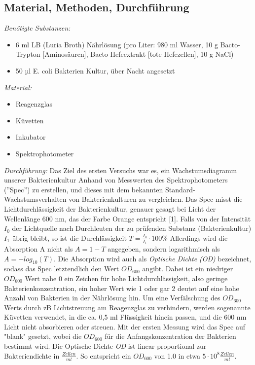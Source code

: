 \documentclass[12pt,twoside]{article}
\begin{document}
\subsection{Material, Methoden, Durchführung}
\textit{Benötigte Substanzen:}
\begin{itemize}
\item 6 ml LB (Luria Broth) Nährlösung (pro Liter: 980 ml Wasser, 10 g Bacto-Trypton [Aminosäuren], Bacto-Hefeextrakt [tote Hefezellen], 10 g NaCl)
\item 50 µl E. coli Bakterien Kultur, über Nacht angesetzt
\end{itemize}
\textit{Material:}
\begin{itemize}
\item Reagenzglas
\item Küvetten
\item Inkubator
\item Spektrophotometer
\end{itemize}
\textit{Durchführung:}\newline
Das Ziel des ersten Versuchs war es, ein Wachstumsdiagramm unserer Bakterienkultur Anhand von Messwerten des Spektrophotometers (''Spec'') zu erstellen, und dieses mit dem bekannten Standard-Wachstumsverhalten von Bakterienkulturen zu vergleichen. Das Spec misst die Lichtdurchlässigkeit der Bakterienkultur, genauer gesagt bei Licht der Wellenlänge 600 nm, das der Farbe Orange entspricht [1]. Falls von der Intensität $I_0$ der Lichtquelle nach Durchleuten der zu prüfenden Substanz (Bakterienkultur) $I_1$ übrig bleibt, so ist die Durchlässigkeit $T = \frac{I_0}{I_1}\cdot 100\%$ Allerdings wird die Absorption A nicht als $A = 1-T$ angegeben, sondern logarithmisch als $A = -log_{10}(T)$. Die Absorption wird auch als \textit{Optische Dichte (OD)} bezeichnet, sodass das Spec letztendlich den Wert $OD_{600}$ angibt. Dabei ist ein niedriger $OD_{600}$ Wert nahe 0 ein Zeichen für hohe Lichtdurchlässigkeit, also geringe Bakterienkonzentration, ein hoher Wert wie 1 oder gar 2 deutet auf eine hohe Anzahl von Bakterien in der Nährlösung hin.\newline
Um eine Verfälschung des $OD_{600}$ Werts durch zB Lichtstreuung am Reagenzglas zu verhindern, werden sogenannte Küvetten verwendet, in die ca. 0,5 ml Flüssigkeit hinein passen, und die 600 nm Licht nicht absorbieren oder streuen. Mit der ersten Messung wird das Spec auf "blank" gesetzt, wobei die $OD_{600}$ für die Anfangskonzentration der Bakterien bestimmt wird. Die Optische Dichte \textit{OD} ist linear proportional zur Bakteriendichte in $\frac{Zellen}{ml}$. So entspricht ein $OD_{600}$ von 1.0 in etwa $5\cdot 10^{8} \frac{Zellen}{ml}$.\newline
\end{document}
